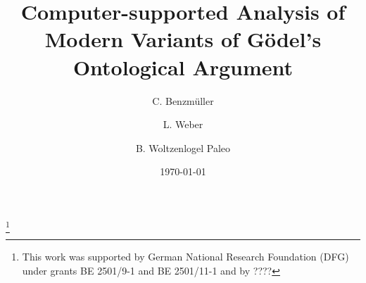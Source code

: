 \documentclass{birkjour}
\theoremstyle{definition}
\theoremstyle{remark}
\numberwithin{equation}{section}
\begin{document}
%
%
%
%
%
%
%
%
%


\title[Analysis of Modern Variants of G\"odel's Ontological Argument]
 {Computer-supported Analysis of Modern Variants of G\"odel's Ontological Argument}



\author[Benzm\"uller]{C. Benzm\"uller}

\address{%
Dep.~of Mathematics and Computer Science, Freie Universit\"at Berlin, Germany
}

\thanks{This work was supported by German National Research Foundation (DFG) under
 grants BE 2501/9-1 and BE 2501/11-1 and by ????}


\author[Weber]{L. Weber}
\address{ 
Dep.~of Mathematics and Computer Science, Freie Universit\"at Berlin, Germany
}


\author[Woltzenlogel-Paleo]{B. Woltzenlogel Paleo}
\address{ 
Favoritenstra{\ss}e 9 \\
Room HA0402 \\
1040 Wien \\
Austria
}






\date{\today}
\dedicatory{ }

\end{document}
